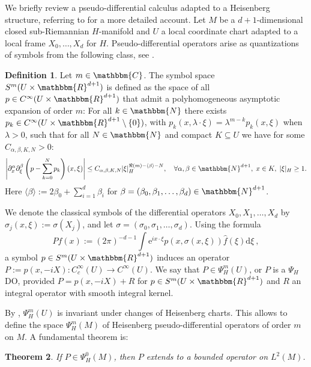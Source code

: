 \documentclass[10pt]{amsart}
\newtheorem{thm}{Theorem}[section]
\theoremstyle{remark}
\theoremstyle{definition}
\newtheorem{deef}[thm]{Definition}
\begin{document}
We briefly review a pseudo-differential calculus adapted to a Heisenberg structure, referring to \cite{bg,pongemono} for a more detailed account. Let $M$ be a $d+1$-dimensional closed sub-Riemannian $H$-manifold and $U$ a local coordinate chart adapted to a local frame $X_0,\ldots, X_d$ for $H$. Pseudo-differential operators arise as quantizations of symbols from the following class, see \cite[Definition 3.1.4 and 3.1.5]{pongemono}.

\begin{deef}
Let $m\in {\mathbbm{C}}$. The symbol space $S^m(U\times {\mathbbm{R}}^{d+1})$ is defined as the space of all $p\in C^\infty(U\times {\mathbbm{R}}^{d+1})$ that admit a polyhomogeneous asymptotic expansion of order $m$: For all $k\in {\mathbbm{N}}$ there exists $p_k\in C^\infty(U\times {\mathbbm{R}}^{d+1}\setminus \{0\})$, with $p_k(x,\lambda\cdot \xi)=\lambda^{m-k}p_k(x,\xi)$ when $\lambda>0$, such that for all $N\in {\mathbbm{N}}$ and compact $K\subseteq U$ 
we have for some $C_{\alpha,\beta,K,N}>0$: \[\left| \partial_x^\alpha\partial_\xi^\beta\left(p-\sum_{k=0}^Np_k\right)(x,\xi)\right|\leq C_{\alpha,\beta,K,N}|\xi|_H^{\Re(m)-\langle \beta\rangle-N},\quad\forall \alpha, \beta \in {\mathbbm{N}}^{d+1}, \;x\in K, \;|\xi|_H\geq 1.\] 
Here $\langle \beta\rangle:=2\beta_0+\sum _{i=1}^d \beta_i$ for $\beta=(\beta_0,\beta_1,\ldots,\beta_d)\in {\mathbbm{N}}^{d+1}$.
\end{deef}

We denote the classical symbols of the differential operators $X_0,X_1,\ldots, X_d$ by $\sigma_j(x,\xi):=\sigma(X_j)$, and let $\sigma = (\sigma_0,\sigma_1,\ldots,\sigma_d)$.  Using the formula
\[Pf(x):=(2\pi)^{-d-1}\int {\mathrm{e}}^{ix\cdot \xi}p(x,\sigma(x,\xi))\hat{f}(\xi){\mathrm{d}} \xi\ ,\] a symbol $p\in S^m(U\times {\mathbbm{R}}^{d+1})$ induces an operator $P:=p(x,-iX):C^\infty_c(U)\to C^\infty(U)$. We say that $P\in \Psi_H^{m}(U)$, or $P$ is a $\Psi_H$DO, provided $P=p(x,-iX)+R$ for $p\in S^m(U\times {\mathbbm{R}}^{d+1})$ and  $R$ an integral operator with smooth integral kernel. 

By \cite[Proposition 3.1.18]{pongemono}, $\Psi_H^{m}(U)$ is invariant under changes of Heisenberg charts. This allows to define the space $\Psi_H^m(M)$ of Heisenberg pseudo-differential operators of order $m$ on $M$. A fundamental theorem is:

\begin{thm}
\label{l2andwhatnot}
If $P\in \Psi^0_H(M)$, then $P$ extends to a bounded operator on $L^2(M)$.
\end{thm}
\end{document}
